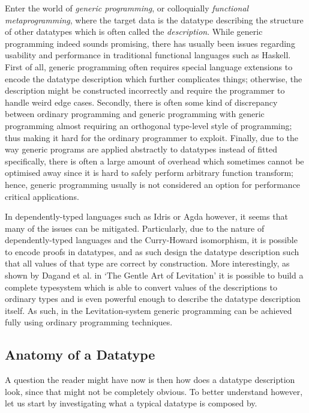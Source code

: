 \documentclass{ituthesis}
\begin{document}
Enter the world of \textit{generic programming}, or colloquially \textit{functional metaprogramming}, where the target data is the datatype describing the structure of other datatypes which is often called the \textit{description}.
While generic programming indeed sounds promising, there has usually been issues regarding usability and performance in traditional functional languages such as Haskell. 
First of all, generic programming often requires special language extensions to encode the datatype description which further complicates things; otherwise, the description might be constructed incorrectly and require the programmer to handle weird edge cases.
Secondly, there is often some kind of discrepancy between ordinary programming and generic programming with generic programming almost requiring an orthogonal type-level style of programming; thus making it hard for the ordinary programmer to exploit.
Finally, due to the way generic programs are applied abstractly to datatypes instead of fitted specifically, there is often a large amount of overhead which sometimes cannot be optimised away since it is hard to safely perform arbitrary function transform; hence, generic programming usually is not considered an option for performance critical applications.

In dependently-typed languages such as Idris or Agda however, it seems that many of the issues can be mitigated.
Particularly, due to the nature of dependently-typed languages and the Curry-Howard isomorphism, it is possible to encode proofs in datatypes, and as such design the datatype description such that all values of that type are correct by construction.
More interestingly, as shown by Dagand et al. in `The Gentle Art of Levitation' it is possible to build a complete typesystem which is able to convert values of the descriptions to ordinary types and is even powerful enough to describe the datatype description itself.
As such, in the Levitation-system generic programming can be achieved fully using ordinary programming techniques.

\subsection{Anatomy of a Datatype}
\label{sub:AnatomyofaDatatype}
A question the reader might have now is then how does a datatype description look, since that might not be completely obvious. To better understand however, let us start by investigating what a typical datatype is composed by.
\end{document}
